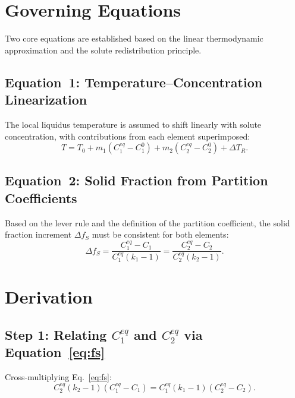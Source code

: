 \documentclass[12pt, a4paper]{article}
\begin{document}
\section{Governing Equations}

Two core equations are established based on the linear thermodynamic approximation
and the solute redistribution principle.

\subsection{Equation~1: Temperature--Concentration Linearization}

The local liquidus temperature is assumed to shift linearly with solute concentration,
with contributions from each element superimposed:
\begin{equation}
  T = T_0
    + m_1\!\left(C_1^{eq} - C_1^0\right)
    + m_2\!\left(C_2^{eq} - C_2^0\right)
    + \Delta T_R .
  \label{eq:temp}
\end{equation}

\subsection{Equation~2: Solid Fraction from Partition Coefficients}

Based on the lever rule and the definition of the partition coefficient,
the solid fraction increment $\Delta f_S$ must be consistent for both elements:
\begin{equation}
  \Delta f_S
  = \frac{C_1^{eq} - C_1}{C_1^{eq}(k_1 - 1)}
  = \frac{C_2^{eq} - C_2}{C_2^{eq}(k_2 - 1)} .
  \label{eq:fs}
\end{equation}

\section{Derivation}

\subsection{Step 1: Relating $C_1^{eq}$ and $C_2^{eq}$ via Equation~\eqref{eq:fs}}

Cross-multiplying Eq.~\eqref{eq:fs}:
\[
  C_2^{eq}(k_2 - 1)(C_1^{eq} - C_1)
  = C_1^{eq}(k_1 - 1)(C_2^{eq} - C_2).
\]
\end{document}
